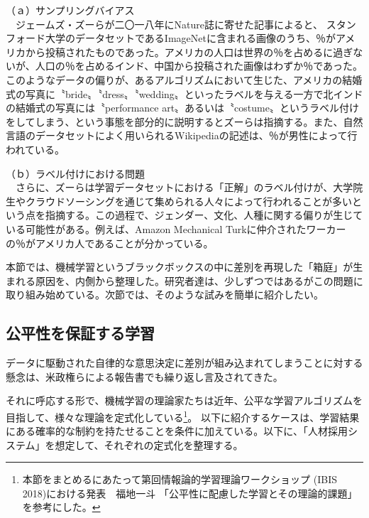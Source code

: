 \documentclass[b5j,twoside,twocolumn]{utarticle}
\begin{document}
（ａ）サンプリングバイアス\\
~~ジェームズ・ズーらが二〇一八年にNature誌に寄せた記事\cite{articleZou}によると、
スタンフォード大学のデータセットであるImageNetに含まれる画像のうち、％がアメリカから投稿されたものであった。アメリカの人口は世界の％を占めるに過ぎないが、人口の％を占めるインド、中国から投稿された画像はわずか％であった。このようなデータの偏りが、あるアルゴリズムにおいて生じた、アメリカの結婚式の写真に〝bride〟〝dress〟〝wedding〟といったラベルを与える一方で北インドの結婚式の写真には〝performance art〟あるいは〝costume〟というラベル付けをしてしまう\cite{shankar2017classification}、という事態を部分的に説明するとズーらは指摘する。また、自然言語のデータセットによく用いられるWikipediaの記述は、％が男性によって行われている\cite{inproceedings}。


（ｂ）ラベル付けにおける問題\\
~~さらに、ズーらは学習データセットにおける「正解」のラベル付けが、大学院生やクラウドソーシングを通じて集められる人々によって行われることが多いという点を指摘する。この過程で、ジェンダー、文化、人種に関する偏りが生じている可能性がある。例えば、Amazon Mechanical Turkに仲介されたワーカーの％がアメリカ人であることが分かっている\cite{Difallah2018DemographicsAD}。


本節では、機械学習というブラックボックスの中に差別を再現した「箱庭」が生まれる原因を、\.内\.側から整理した。研究者達は、少しずつではあるがこの問題に取り組み始めている。次節では、そのような試みを簡単に紹介したい。


\subsection{公平性を保証する学習}
データに駆動された自律的な意思決定に差別が組み込まれてしまうことに対する懸念は、米政権らによる報告書でも繰り返し言及されてきた\cite{obama}\cite{obama2}。

それに呼応する形で、機械学習の理論家たちは近年、公平な学習アルゴリズムを目指して、様々な理論を定式化している\footnote{本節をまとめるにあたって第回情報論的学習理論ワークショップ (IBIS 2018)における発表　福地一斗 「公平性に配慮した学習とその理論的課題」を参考にした。}。
以下に紹介するケースは、学習結果にある確率的な制約を持たせることを条件に加えている。以下に、「人材採用システム」を想定して、それぞれの定式化を整理する。
\end{document}
